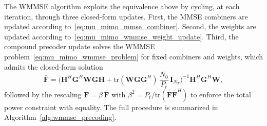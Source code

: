 The \ac{WMMSE} algorithm exploits the equivalence above by cycling, at each iteration, through three closed-form updates.
First, the \ac{MMSE} combiners are updated according to~\eqref{eq:mu_mimo_mmse_combiner}.
Second, the weights are updated according to~\eqref{eq:mu_mimo_wmmse_weight_update}.
Third, the compound precoder update solves the \ac{WMMSE} problem~\eqref{eq:mu_mimo_wmmse_problem} for fixed combiners and weights, which admits the closed-form solution~\cite{WMMSE_precoding_ref18}
\begin{equation}
\label{eq:mu_mimo_wmmse_precoder_update}
    \bar{\mathbf{F}} = \Big(\mathbf{H}^H \mathbf{G}^H \mathbf{W} \mathbf{G} \mathbf{H} + \mathrm{tr}(\mathbf{W} \mathbf{G} \mathbf{G}^H) \, \frac{N_0}{P_t} \, \mathbf{I}_{N_T}\Big)^{-1} \mathbf{H}^H \mathbf{G}^H \mathbf{W},
\end{equation}
followed by the rescaling $\mathbf{F} = \beta \, \bar{\mathbf{F}}$ with $\beta^2 = P_t / \mathrm{tr}(\bar{\mathbf{F}} \bar{\mathbf{F}}^H)$ to enforce the total power constraint with equality.
The full procedure is summarized in Algorithm~\ref{alg:wmmse_precoding}.

